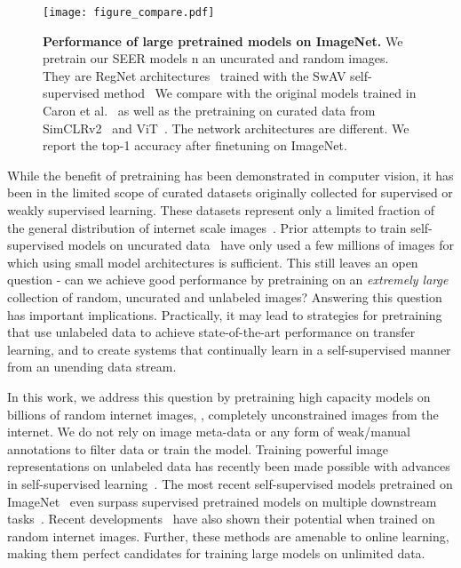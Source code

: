 \documentclass[final]{cvpr}
\begin{document}
\begin{figure}[t]
  \texttt{[image: figure\_compare.pdf]} 
  \vspace{-0.1in}
  \caption{
    \textbf{Performance of large pretrained models on ImageNet.}
    We pretrain our SEER models n an uncurated and random images.
    They are RegNet architectures~\cite{radosavovic2020designing} trained with the SwAV self-supervised method~\cite{caron2020unsupervised}
    We compare with the original models trained in Caron et al.~\cite{caron2020unsupervised}
    as well as the pretraining on curated data from SimCLRv2~\cite{chen2020big} and ViT~\cite{dosovitskiy2020image}.
    The network architectures are different. 
    We report the top-1 accuracy after finetuning on ImageNet.
  }
  \label{fig:pullfig}
\end{figure}

While the benefit of pretraining has been demonstrated in computer vision, it has been in the limited scope of curated datasets originally collected for supervised or weakly supervised learning. These datasets represent only a limited fraction of the general distribution of internet scale images~\cite{henaff2019data,kolesnikov2019big,mahajan2018exploring}. 
Prior attempts to train self-supervised models on uncurated data~\cite{caron2019unsupervised,doersch2015unsupervised,goyal2019scaling,joulin2016learning} have only used a few millions of images for which using small model architectures is sufficient. This still leaves an open question - can we achieve good performance by pretraining on an \emph{extremely large} collection of random, uncurated and unlabeled images? Answering this question has important implications. 
Practically, it may lead to strategies for pretraining that use unlabeled data to achieve state-of-the-art performance on transfer learning, and to create systems that continually learn in a self-supervised manner from an unending data stream.

In this work, we address this question by pretraining high capacity models on billions of random internet images, \ie, completely unconstrained images from the internet. We do not rely on image meta-data or any form of weak/manual annotations to filter data or train the model.
Training powerful image representations on unlabeled data has recently been made possible with advances in self-supervised learning~\cite{caron2019unsupervised,chen2020simple,grill2020bootstrap,he2020momentum}.
The most recent self-supervised models pretrained on ImageNet~\cite{russakovsky2015imagenet} even surpass supervised pretrained models on multiple downstream tasks~\cite{he2020momentum}. 
Recent developments~\cite{caron2020unsupervised} have also shown their potential when trained on random internet images.
Further, these methods are amenable to online learning, making them perfect candidates for training large models on unlimited data.
\end{document}
